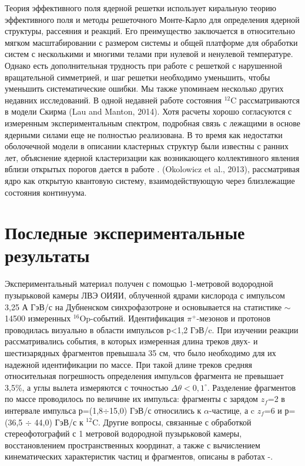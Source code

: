 \documentclass[fontsize=14pt]{scrreport}
\begin{document}
Теория эффективного поля ядерной решетки использует киральную теорию эффективного поля и методы решеточного Монте-Карло для определения ядерной структуры, рассеяния и реакций. Его преимущество заключается в относительно мягком масштабировании с размером системы и общей платформе для обработки систем с несколькими и многими телами при нулевой и ненулевой температуре. Однако есть дополнительная трудность при работе с решеткой с нарушенной вращательной симметрией, и шаг решетки необходимо уменьшить, чтобы уменьшить систематические ошибки.
Мы также упоминаем несколько других недавних исследований. В одной недавней работе состояния $^{12}$C рассматриваются в модели Скирма (Lau and Manton, 2014). Хотя расчеты хорошо согласуются с измеренным экспериментальным спектром, подробная связь с лежащими в основе ядерными силами еще не полностью реализована. В то время как недостатки оболочечной модели в описании кластерных структур были известны с ранних лет, объяснение ядерной кластеризации как возникающего коллективного явления вблизи открытых порогов дается в работе \cite{5}. (Okolowicz et al., 2013), рассматривая ядро как открытую квантовую систему, взаимодействующую через близлежащие состояния континуума.


\section{ Последные экспериментальные результаты}
\hspace{0.6cm}
Экспериментальный материал получен с помощью 1-метровой водородной пузырьковой камеры ЛВЭ ОИЯИ, облученной ядрами кислорода с импульсом 3,25 А ГэВ/с на Дубненском синхрофазотроне и основывается на статистике $\sim$14500 измеренных $^{16}$Op-событий. Идентификация $\pi^{+}$-мезонов и протонов проводилась визуально в области импульсов р<1,2 ГэВ/c. При изучении реакции  рассматривались события, в которых измеренная длина треков двух- и шестизарядных фрагментов превышала 35 см, что было необходимо для их надежной идентификации по массе. При такой длине треков средняя относительная погрешность определения импульсов фрагмента не превышает 3,5\%, а углы вылета измеряются с точностью $\Delta\theta<0,1^{\circ}$. Разделение фрагментов по массе проводилось по величине их импульса: фрагменты с зарядом $z_{f}$=2 в интервале импульса р=(1,8$\div$15,0) ГэВ/с относились к $\alpha$-частице, а c $z_{f}$=6 и р=(36,5 $\div$ 44,0) ГэВ/с  к $^{12}$C. Другие вопросы, связанные с обработкой стереофотографий с 1 метровой водородной пузырьковой камеры, восстановлением пространственных координат, а также с вычислением кинематических характеристик частиц и фрагментов, описаны в работах \cite{1}-\cite{4}.
\end{document}
